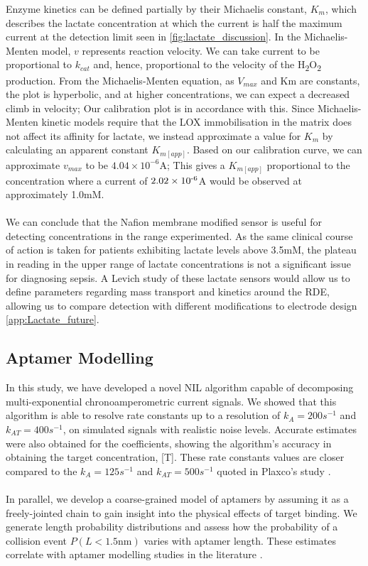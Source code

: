 Enzyme kinetics can be defined partially by their Michaelis constant, $K_{m}$, which describes the lactate concentration at which the current is half the maximum current at the detection limit seen in \autoref{fig:lactate_discussion}. In the Michaelis- Menten model, $v$ represents reaction velocity. We can take current to be proportional to $k_{cat}$ and, hence, proportional to the velocity of the H\textsubscript{2}O\textsubscript{2} production. From the Michaelis-Menten equation, as $V_{max}$ and Km are constants, the plot is hyperbolic, and at higher concentrations, we can expect a decreased climb in velocity; Our calibration plot is in accordance with this. Since Michaelis-Menten kinetic models require that the LOX immobilisation in the matrix does not affect its affinity for lactate, we instead approximate a value for $K_{m}$ by calculating an apparent constant $K_{m[app]}$.  Based on our calibration curve, we can approximate $v_{max}$ to be $4.04\times10^{-6}$A; This gives a $K_{m[app]}$ proportional to the concentration where a current of $2.02\times 10\textsuperscript{-6}$A would be observed at approximately 1.0mM.\\\\
We can conclude that the Nafion membrane modified sensor is useful for detecting concentrations in the range experimented. As the same clinical course of action is taken for patients exhibiting lactate levels above 3.5mM, the plateau in reading in the upper range of lactate concentrations is not a significant issue for diagnosing sepsis. A Levich study of these lactate sensors would allow us to define parameters regarding mass transport and kinetics around the RDE, allowing us to compare detection with different modifications to electrode design \autoref{app:Lactate_future}.
\subsection{Aptamer Modelling}
In this study, we have developed a novel NIL algorithm capable of decomposing multi-exponential chronoamperometric current signals. We showed that this algorithm is able to resolve rate constants up to a resolution of $k_{A} = 200s^{-1}$ and $k_{AT} = 400s^{-1}$, on simulated signals with realistic noise levels. Accurate estimates were also obtained for the coefficients, showing the algorithm's accuracy in obtaining the target concentration, [T]. These rate constants values are closer compared to the $k_{A} = 125s^{-1}$ and $k_{AT} = 500s^{-1}$ quoted in Plaxco's study \cite{arroyo2018subsecond}.\\\\
In parallel, we develop a coarse-grained model of aptamers by assuming it as a freely-jointed chain to gain insight into the physical effects of target binding. We generate length probability distributions and assess how the probability of a collision event $P(L<1.5\text{nm})$ varies with aptamer length. These estimates correlate with aptamer modelling studies in the literature \cite{uzawa2010mechanistic,uzawa2009length}.